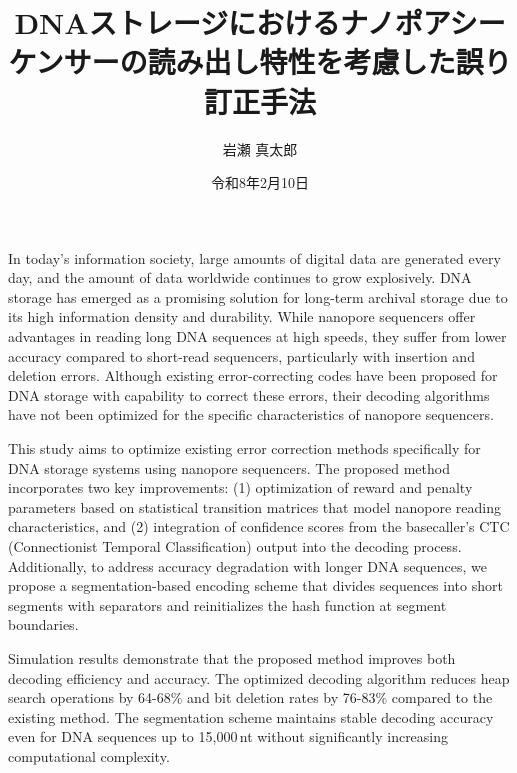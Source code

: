 \documentclass[sotsuron]{kuee}
\title{DNAストレージにおけるナノポアシーケンサーの読み出し特性を考慮した誤り訂正手法}
\author{岩瀬 真太郎}
\date{令和8年2月10日}
\begin{document}
\maketitle			%
\begin{eabstract}		%
In today's information society, large amounts of digital data are generated 
every day, and the amount of data worldwide continues to grow explosively. 
DNA storage has emerged as a promising solution for long-term archival storage 
due to its high information density and durability. While nanopore sequencers 
offer advantages in reading long DNA sequences at high speeds, they suffer from 
lower accuracy compared to short-read sequencers, particularly with insertion 
and deletion errors. Although existing error-correcting codes have been proposed 
for DNA storage with capability to correct these errors, their decoding algorithms 
have not been optimized for the specific characteristics of nanopore sequencers.

This study aims to optimize existing error correction methods 
specifically for DNA storage systems using nanopore sequencers. The proposed 
method incorporates two key improvements: (1) optimization of reward and penalty 
parameters based on statistical transition matrices that model nanopore reading 
characteristics, and (2) integration of confidence scores from the basecaller's 
CTC (Connectionist Temporal Classification) output into the decoding process. 
Additionally, to address accuracy degradation with longer DNA sequences, we 
propose a segmentation-based encoding scheme that divides sequences into short 
segments with separators and reinitializes the hash function at segment boundaries.

Simulation results demonstrate that the proposed method improves 
both decoding efficiency and accuracy. The optimized decoding algorithm reduces 
heap search operations by 64-68\% and bit deletion rates by 76-83\% compared to 
the existing method. The segmentation scheme maintains stable decoding accuracy 
even for DNA sequences up to 15,000\,nt without significantly increasing computational 
complexity. 

\end{eabstract}
\tableofcontents		%
\end{document}
